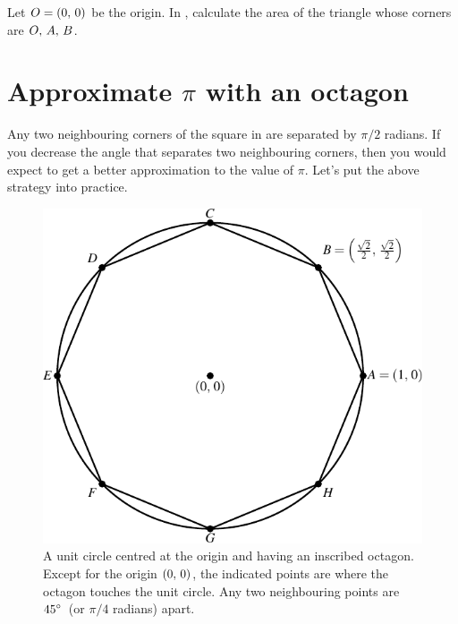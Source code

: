 \documentclass[a4paper,oneside,12pt]{article}
\begin{document}
\begin{exercise}
Let $O = \left\lparen{0},\, {0}\right\rparen$ be the origin.  In
, calculate the area of the
triangle whose corners are ${O},\, {A},\, {B}$.
\end{exercise}




\section{Approximate $\pi$ with an octagon}
\label{sec:approximate_pi_with_an_octagon}

Any two neighbouring corners of the square in
 are separated by $\pi / 2$
radians.  If you decrease the angle that separates two neighbouring
corners, then you would expect to get a better approximation to the
value of $\pi$.  Let's put the above strategy into practice.

\begin{figure}[!htbp]
\centering
\includegraphics[scale=1]{image/05/circle-octagon.pdf}
\caption{%
  A unit circle centred at the origin and having an inscribed
  octagon.  Except for the origin $\left\lparen{0},\, {0}\right\rparen$, the indicated points
  are where the octagon touches the unit circle.  Any two neighbouring
  points are ${45}^{\circ}$~(or $\pi / 4$ radians) apart.
}
\label{fig:circle_inscribed_octagon}
\end{figure}
\end{document}
